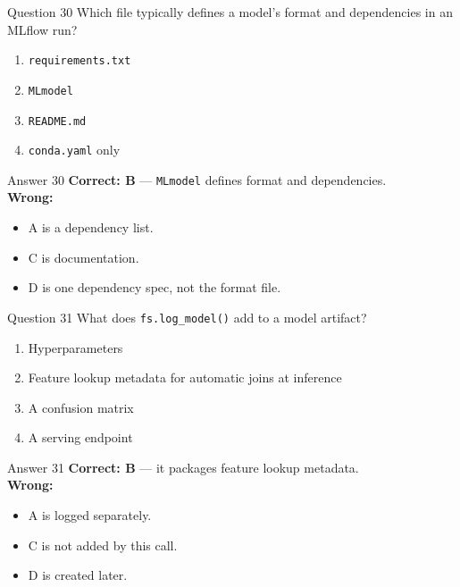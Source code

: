 \documentclass[aspectratio=169,11pt]{beamer}
\begin{document}
	\begin{frame}{Question 30}
		Which file typically defines a model's format and dependencies in an MLflow run?
		\begin{enumerate}[label=\Alph*.]
			\item \texttt{requirements.txt}
			\item \texttt{MLmodel}
			\item \texttt{README.md}
			\item \texttt{conda.yaml} only
		\end{enumerate}
	\end{frame}
	\begin{frame}{Answer 30}
		\textbf{Correct: B} --- \texttt{MLmodel} defines format and dependencies.\\
		\vspace{0.5em}
		\textbf{Wrong:}
		\begin{itemize}
			\item A is a dependency list.
			\item C is documentation.
			\item D is one dependency spec, not the format file.
		\end{itemize}
	\end{frame}
	
	\begin{frame}{Question 31}
		What does \texttt{fs.log\_model()} add to a model artifact?
		\begin{enumerate}[label=\Alph*.]
			\item Hyperparameters
			\item Feature lookup metadata for automatic joins at inference
			\item A confusion matrix
			\item A serving endpoint
		\end{enumerate}
	\end{frame}
	\begin{frame}{Answer 31}
		\textbf{Correct: B} --- it packages feature lookup metadata.\\
		\vspace{0.5em}
		\textbf{Wrong:}
		\begin{itemize}
			\item A is logged separately.
			\item C is not added by this call.
			\item D is created later.
		\end{itemize}
	\end{frame}
	
\end{document}
